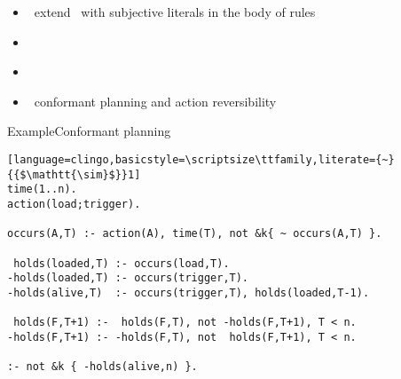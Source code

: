 \begin{frame}{\eclingo}
  \begin{itemize}
  \item {} \ extend \clingo\ with subjective literals in the body of rules
  \item {} \
  \item {} \ \cite{cafagarosc20a}
  \item {} \ conformant planning \cite{cafafa21a} and action reversibility \cite{famoch21a}
  \end{itemize}
\end{frame}
\begin{frame}[fragile]{Example}{Conformant planning}
\begin{lstlisting}[language=clingo,basicstyle=\scriptsize\ttfamily,literate={~}{{$\mathtt{\sim}$}}1]
time(1..n).
action(load;trigger).

occurs(A,T) :- action(A), time(T), not &k{ ~ occurs(A,T) }.

 holds(loaded,T) :- occurs(load,T).
-holds(loaded,T) :- occurs(trigger,T).
-holds(alive,T)  :- occurs(trigger,T), holds(loaded,T-1).

 holds(F,T+1) :-  holds(F,T), not -holds(F,T+1), T < n.
-holds(F,T+1) :- -holds(F,T), not  holds(F,T+1), T < n.

:- not &k { -holds(alive,n) }.
\end{lstlisting}
\end{frame}
%
